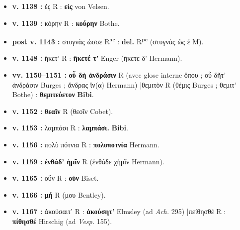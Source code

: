 \documentclass[10pt, a4paper, twoside]{book}
\renewcommand{\_}{\origunderscore\penalty0\relax}
\providecommand{\italique}[1]{\emph{#1}}
\providecommand{\lecon}[1]{\textbf{#1}}
\providecommand{\expo}[1]{\textsuperscript{#1}}
\providecommand{\Rac}{R\expo{ac}}
\providecommand{\Rpc}{R\expo{pc}}
\providecommand{\Mon}{M}
\providecommand{\espApp}{\hspace{0.5em}|\hspace{0.5em}}
\begin{document}
\begin{itemize}
\begin{itemize}
    \item \textbf{v. 1138 :} ἐς R : \lecon{εἰς} von Velsen.
    \item \textbf{v. 1139 :} κόρην R : \lecon{κούρην} Bothe.
    \item \textbf{post v. 1143 :} στυγνὰς ὡσσε \Rac{} : \lecon{del.} \Rpc{} (στυγνὰς ὡς ἐ \Mon{}).
    \item \textbf{v. 1148 :} ἥκετ' R : \lecon{ἥκετέ τ'} Enger (ἥκετε δ' Hermann).
    \item \textbf{vv. 1150–1151 :} \lecon{οὗ δὴ ἀνδράσιν} R (avec glose interne ὅπου ; οὗ δῆτ' ἀνδράσιν Burges ; ἄνδρας ἵν(α) Hermann) \espApp θεμιτὸν R (θέμις Burges ; θεμιτ' Bothe) : \lecon{θεμιτεύετον} \lecon{Bibi}.
    \item \textbf{v. 1152 :} \lecon{θεαῖν} R (θεοῖν Cobet).
    \item \textbf{v. 1153 :} λαμπάσι R : \lecon{λαμπάσι.} \lecon{Bibi}.
    \item \textbf{v. 1156 :} πολὺ πότνια R : \lecon{πολυποτνία} Hermann.
    \item \textbf{v. 1159 :} \lecon{ἐνθάδ' ἡμῖν} R (ἐνθάδε χἠμῖν Hermann).
    \item \textbf{v. 1165 :} οὖν R : \lecon{οὑν} Biset.
    \item \textbf{v. 1166 :} \lecon{μή} R (μου Bentley).
    \item \textbf{v. 1167 :} ἀκούσαιτ' R : \lecon{ἀκούσητ'} Elmsley (ad \italique{Ach.} 295) \espApp πείθησθέ R : \lecon{πίθησθέ} Hirschig (ad \italique{Vesp.} 155).
  \end{itemize}
\end{itemize}
\end{document}
